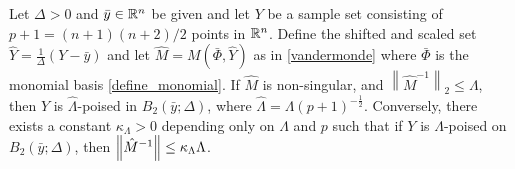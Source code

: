 \documentclass{article}
\begin{document}
\begin{theorem} \label{scale_the_radius}
\label{Lambda_poised_error_bounds_delta}
Let $\Delta >0$ and $\bar{y} \in \mathbb R^n$ be given and  let $Y$ be a sample set consisting of $p+1=(n+1)(n+2)/2$ points in  $\mathbb R^n$.
Define the shifted and scaled set $\hat{Y} = \frac{1}{\Delta} \left(Y-\bar{y}\right)$ and let $\hat{M}=M(\bar{\Phi},\hat{Y})$ as in \cref{vandermonde} where $\bar{\Phi}$ is the monomial basis \cref{define_monomial}.
If $\hat{M}$ is non-singular, and $\left\|{\hat{M}^{-1}}\right\|_2 \le \Lambda$, then $Y$ is $\hat{\Lambda}$-poised in $B_2(\bar{y};\Delta)$,
where $\hat{\Lambda} = \Lambda \left(p+1\right)^{-\frac 1 2}$.
Conversely,  there exists a constant $\kappa_\Lambda > 0$ depending only on $\Lambda$ and $p$ such that if $Y$ is $\Lambda$-poised on $B_2(\bar{y};\Delta)$, then ${\left\|\hat{M}^{-1}\right\|} \le \kappa_{\Lambda} \Lambda$.
\end{theorem}
\end{document}
